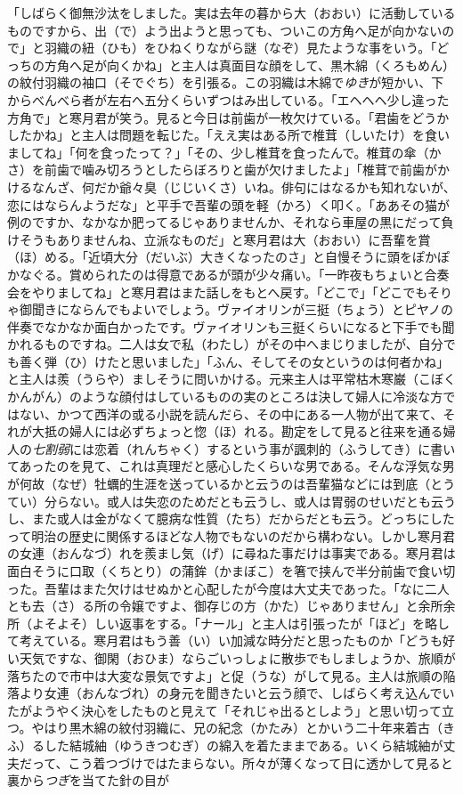 \documentclass{book}
\begin{document}
「しばらく御無沙汰をしました。実は去年の暮から大（おおい）に活動しているものですから、出（で）よう出ようと思っても、ついこの方角へ足が向かないので」と羽織の紐（ひも）をひねくりながら謎（なぞ）見たような事をいう。「どっちの方角へ足が向くかね」と主人は真面目な顔をして、黒木綿（くろもめん）の紋付羽織の袖口（そでぐち）を引張る。この羽織は木綿で\emph{ゆき}が短かい、下からべんべら者が左右へ五分くらいずつはみ出している。「エヘヘヘ少し違った方角で」と寒月君が笑う。見ると今日は前歯が一枚欠けている。「君歯をどうかしたかね」と主人は問題を転じた。「ええ実はある所で椎茸（しいたけ）を食いましてね」「何を食ったって？」「その、少し椎茸を食ったんで。椎茸の傘（かさ）を前歯で噛み切ろうとしたらぼろりと歯が欠けましたよ」「椎茸で前歯がかけるなんざ、何だか爺々臭（じじいくさ）いね。俳句にはなるかも知れないが、恋にはならんようだな」と平手で吾輩の頭を軽（かろ）く叩く。「ああその猫が例のですか、なかなか肥ってるじゃありませんか、それなら車屋の黒にだって負けそうもありませんね、立派なものだ」と寒月君は大（おおい）に吾輩を賞（ほ）める。「近頃大分（だいぶ）大きくなったのさ」と自慢そうに頭をぽかぽかなぐる。賞められたのは得意であるが頭が少々痛い。「一昨夜もちょいと合奏会をやりましてね」と寒月君はまた話しをもとへ戻す。「どこで」「どこでもそりゃ御聞きにならんでもよいでしょう。ヴァイオリンが三挺（ちょう）とピヤノの伴奏でなかなか面白かったです。ヴァイオリンも三挺くらいになると下手でも聞かれるものですね。二人は女で私（わたし）がその中へまじりましたが、自分でも善く弾（ひ）けたと思いました」「ふん、そしてその女というのは何者かね」と主人は羨（うらや）ましそうに問いかける。元来主人は平常枯木寒巌（こぼくかんがん）のような顔付はしているものの実のところは決して婦人に冷淡な方ではない、かつて西洋の或る小説を読んだら、その中にある一人物が出て来て、それが大抵の婦人には必ずちょっと惚（ほ）れる。勘定をして見ると往来を通る婦人の\emph{七割弱}には恋着（れんちゃく）するという事が諷刺的（ふうしてき）に書いてあったのを見て、これは真理だと感心したくらいな男である。そんな浮気な男が何故（なぜ）牡蠣的生涯を送っているかと云うのは吾輩猫などには到底（とうてい）分らない。或人は失恋のためだとも云うし、或人は胃弱のせいだとも云うし、また或人は金がなくて臆病な性質（たち）だからだとも云う。どっちにしたって明治の歴史に関係するほどな人物でもないのだから構わない。しかし寒月君の女連（おんなづ）れを羨まし気（げ）に尋ねた事だけは事実である。寒月君は面白そうに口取（くちとり）の蒲鉾（かまぼこ）を箸で挟んで半分前歯で食い切った。吾輩はまた欠けはせぬかと心配したが今度は大丈夫であった。「なに二人とも去（さ）る所の令嬢ですよ、御存じの方（かた）じゃありません」と余所余所（よそよそ）しい返事をする。「ナール」と主人は引張ったが「ほど」を略して考えている。寒月君はもう善（い）い加減な時分だと思ったものか「どうも好い天気ですな、御閑（おひま）ならごいっしょに散歩でもしましょうか、旅順が落ちたので市中は大変な景気ですよ」と促（うな）がして見る。主人は旅順の陥落より女連（おんなづれ）の身元を聞きたいと云う顔で、しばらく考え込んでいたがようやく決心をしたものと見えて「それじゃ出るとしよう」と思い切って立つ。やはり黒木綿の紋付羽織に、兄の紀念（かたみ）とかいう二十年来着古（きふ）るした結城紬（ゆうきつむぎ）の綿入を着たままである。いくら結城紬が丈夫だって、こう着つづけではたまらない。所々が薄くなって日に透かして見ると裏から\emph{つぎ}を当てた針の目が
\end{document}
